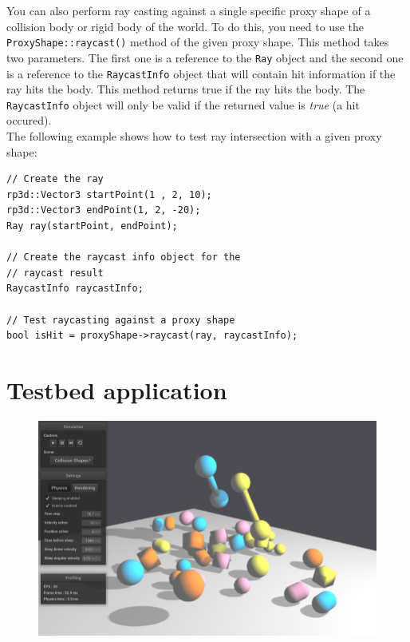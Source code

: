 \documentclass[a4paper,12pt]{article}
\begin{document}
    You can also perform ray casting against a single specific proxy shape of a collision body or rigid body of the world. To do this, you need to use the
    \texttt{ProxyShape::raycast()} method of the given proxy shape. This method takes two parameters. The first one is a reference to the \texttt{Ray}
    object and the second one is a reference to the \texttt{RaycastInfo} object that will contain hit information if the ray hits the body. This method returns
    true if the ray hits the body. The \texttt{RaycastInfo} object will only be valid if the returned value is \emph{true} (a hit occured). \\

    The following example shows how to test ray intersection with a given proxy shape: \\

    \begin{lstlisting}
// Create the ray
rp3d::Vector3 startPoint(1 , 2, 10);
rp3d::Vector3 endPoint(1, 2, -20);
Ray ray(startPoint, endPoint);

// Create the raycast info object for the
// raycast result
RaycastInfo raycastInfo;

// Test raycasting against a proxy shape
bool isHit = proxyShape->raycast(ray, raycastInfo);
    \end{lstlisting}

    \vspace{0.6cm}

    \section{Testbed application}
    \label{sec:testbed}

    \begin{figure}[h]
        \centering
        \includegraphics{testbed.png}
        \label{fig:testbed}
    \end{figure}
\end{document}
